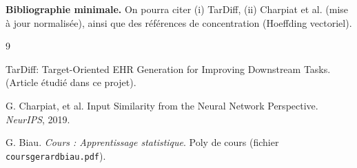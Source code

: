 \documentclass[11pt]{article}
\begin{document}
\vspace{8pt}
\noindent\textbf{Bibliographie minimale.}
On pourra citer (i) TarDiff, (ii) Charpiat et al. (mise à jour normalisée), ainsi que des références de concentration (Hoeffding vectoriel).

\begin{thebibliography}{9}

TarDiff: Target-Oriented EHR Generation for Improving Downstream Tasks.
(Article étudié dans ce projet).



G. Charpiat, et al.
Input Similarity from the Neural Network Perspective.
\emph{NeurIPS}, 2019.

G. Biau.
\emph{Cours : Apprentissage statistique}.
Poly de cours (fichier \texttt{coursgerardbiau.pdf}).

\end{thebibliography}
\end{document}
